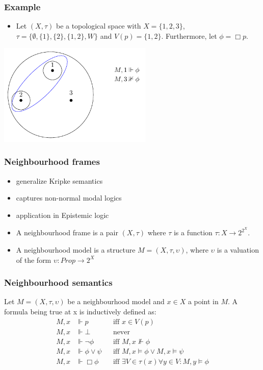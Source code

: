 \documentclass[hyperref={pdfpagelabels=false},t,10pt]{beamer}
\begin{document}
\begin{frame}
  
  \frametitle{Example}
  \begin{itemize}
    \item  Let $(X,\tau)$ be a topological space with 
    $X = \{1,2,3\}$, $\tau = \{\emptyset, \{1\}, \{2\}, \{1,2\}, W\}$ and $V(p) = \{1,2\}$. Furthermore, let $\phi = \Box p$.
    \pause
  \end{itemize}
  \centering
  \includegraphics[width=0.55\textwidth]{Example2.pdf}
\end{frame}


\begin{frame}
  \frametitle{Neighbourhood frames}
  \begin{itemize}
    \item generalize Kripke semantics
    \item captures non-normal modal logics
    \item application in Epistemic logic
    \pause
    \item A neighbourhood frame is a pair $(X, \tau)$ where $\tau$ is a function $\tau : X \rightarrow 2^{2^X}$.
    \item A neighbourhood model is a structure $M = (X, \tau, \upsilon)$, where $\upsilon$ is a valuation of the form $\upsilon : Prop \rightarrow 2^X$
  \end{itemize}
\end{frame}

\begin{frame}
  \frametitle{Neighbourhood semantics}
  Let $M = (X,\tau,\upsilon)$ be a neighbourhood model and $x \in X$ a point in $M$. A formula being true at x is inductively defined as:
      \begin{align*}
        M,x &\Vdash p &&\text{iff } x \in V(p)\\
        M,x &\Vdash \bot &&\text{never } \\
        M,x &\Vdash \neg \phi &&\text{iff } M,x \nVdash \phi\\
        M,x &\Vdash \phi \lor \psi &&\text{iff } M,x \vDash \phi \lor M,x \vDash \psi\\
        M,x &\Vdash \Box \phi &&\text{iff } \exists V \in \tau(x) \forall y \in V : M,y \models \phi
    \end{align*}

\end{frame}
\end{document}
